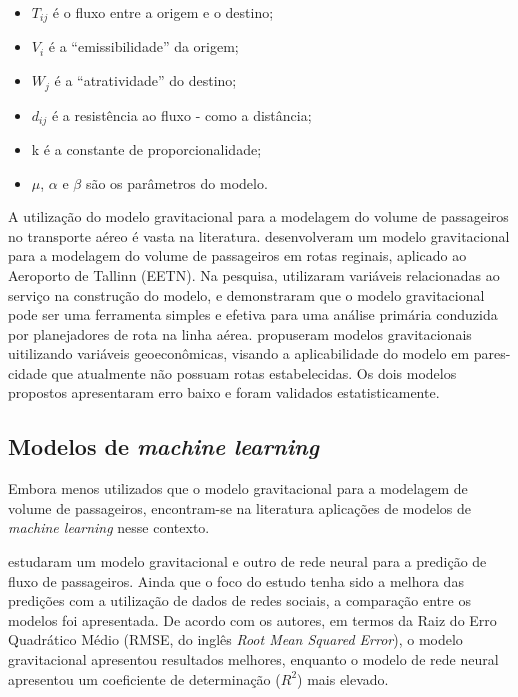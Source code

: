 \documentclass[12pt]{article}
\providecommand{\tightlist}{%
  \setlength{\itemsep}{0pt}\setlength{\parskip}{0pt}}
\begin{document}
\begin{itemize}
\tightlist
\item
  \(T_{ij}\) é o fluxo entre a origem e o destino;
\item
  \(V_i\) é a \enquote{emissibilidade} da origem;
\item
  \(W_j\) é a \enquote{atratividade} do destino;
\item
  \(d_{ij}\) é a resistência ao fluxo - como a distância;
\item
  k é a constante de proporcionalidade;
\item
  \(\mu\), \(\alpha\) e \(\beta\) são os parâmetros do modelo.
\end{itemize}

A utilização do modelo gravitacional para a modelagem do volume de
passageiros no transporte aéreo é vasta na literatura.
\citet{Nommik2016} desenvolveram um modelo gravitacional para a
modelagem do volume de passageiros em rotas reginais, aplicado ao
Aeroporto de Tallinn (EETN). Na pesquisa, utilizaram variáveis
relacionadas ao serviço na construção do modelo, e demonstraram que o
modelo gravitacional pode ser uma ferramenta simples e efetiva para uma
análise primária conduzida por planejadores de rota na linha aérea.
\citet{Grosche2007} propuseram modelos gravitacionais uitilizando
variáveis geoeconômicas, visando a aplicabilidade do modelo em
pares-cidade que atualmente não possuam rotas estabelecidas. Os dois
modelos propostos apresentaram erro baixo e foram validados
estatisticamente.

\hypertarget{modelos-de-machine-learning}{%
\subsection{\texorpdfstring{Modelos de \emph{machine
learning}}{Modelos de machine learning}}\label{modelos-de-machine-learning}}

Embora menos utilizados que o modelo gravitacional para a modelagem de
volume de passageiros, encontram-se na literatura aplicações de modelos
de \emph{machine learning} nesse contexto.

\citet{pourebrahim2018} estudaram um modelo gravitacional e outro de
rede neural para a predição de fluxo de passageiros. Ainda que o foco do
estudo tenha sido a melhora das predições com a utilização de dados de
redes sociais, a comparação entre os modelos foi apresentada. De acordo
com os autores, em termos da Raiz do Erro Quadrático Médio (RMSE, do
inglês \emph{Root Mean Squared Error}), o modelo gravitacional
apresentou resultados melhores, enquanto o modelo de rede neural
apresentou um coeficiente de determinação (\(R^2\)) mais elevado.
\end{document}
